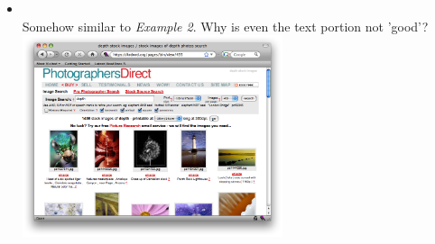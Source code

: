 \documentclass[12pt]{article}
\begin{document}
\begin{itemize}
\item {} \\
Somehow similar to \emph{Example 2}. Why is even the text portion not 'good'? \\
\includegraphics[width=0.6\textwidth]{images/435.png} \\

\end{itemize}
\end{document}
